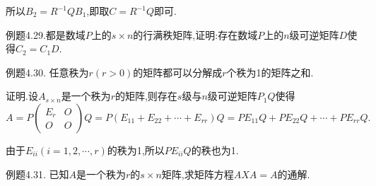 \documentclass{article}
\begin{document}
所以$B_2 = R^{-1}QB_1$,即取$C = R^{-1}Q$即可.

{\heiti 例题4.29.}{\kaishu 都是数域$P$上的$s \times n$的行满秩矩阵,证明:存在数域$P$上的$n$级可逆矩阵$D$使得$C_2 = C_1D$.}

{\heiti 例题4.30.} {\kaishu 任意秩为$r \left(r > 0\right)$的矩阵都可以分解成$r$个秩为1的矩阵之和.}

{\heiti 证明.}设$A_{s \times n}$是一个秩为$r$的矩阵,则存在$s$级与$n$级可逆矩阵$P_1Q$使得
\begin{equation*}
    A=P\left(\begin{array}{cc}
            E_{r} & O \\
            O     & O
        \end{array}\right) Q=P\left(E_{11}+E_{22}+\cdots+E_{r r}\right) Q=P E_{11} Q+P E_{22} Q+\cdots+P E_{r r} Q.
\end{equation*}

由于$E_{i i} \left(i = 1,2, \cdots , r\right)$的秩为1,所以$PE_{i i}Q$的秩也为1.

{\heiti 例题4.31.} {\kaishu 已知$A$是一个秩为$r$的$s \times n$矩阵,求矩阵方程$AXA = A$的通解.}
\end{document}
